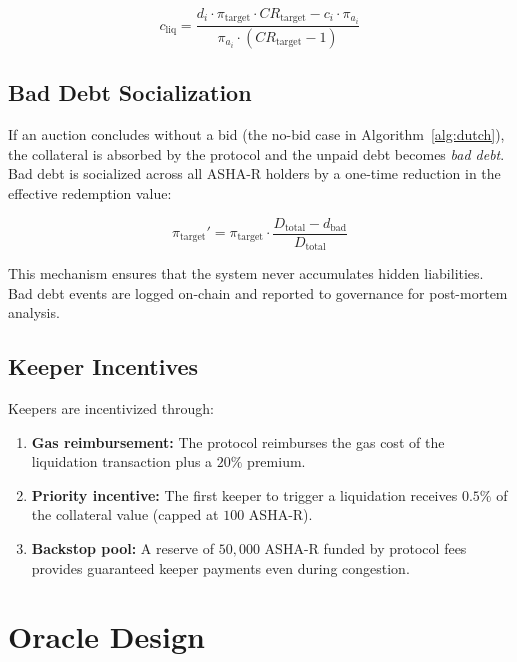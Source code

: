 \documentclass[11pt,a4paper]{article}
\newcommand{\ashares}{\textsc{ASHA-R}\xspace}
\newcommand{\CR}{\mathit{CR}}
\begin{document}
\begin{equation}
  c_{\text{liq}} = \frac{d_i \cdot \pi_{\text{target}} \cdot \CR_{\text{target}} - c_i \cdot \pi_{a_i}}{\pi_{a_i} \cdot (\CR_{\text{target}} - 1)}
\end{equation}

\subsection{Bad Debt Socialization}

If an auction concludes without a bid (the no-bid case in Algorithm~\ref{alg:dutch}), the collateral is absorbed by the protocol and the unpaid debt becomes \emph{bad debt}.
Bad debt is socialized across all \ashares holders by a one-time reduction in the effective redemption value:

\begin{equation}
  \pi_{\text{target}}' = \pi_{\text{target}} \cdot \frac{D_{\text{total}} - d_{\text{bad}}}{D_{\text{total}}}
\end{equation}

This mechanism ensures that the system never accumulates hidden liabilities.
Bad debt events are logged on-chain and reported to governance for post-mortem analysis.

\subsection{Keeper Incentives}

Keepers are incentivized through:
\begin{enumerate}
  \item \textbf{Gas reimbursement:} The protocol reimburses the gas cost of the liquidation transaction plus a $20\%$ premium.
  \item \textbf{Priority incentive:} The first keeper to trigger a liquidation receives $0.5\%$ of the collateral value (capped at $100$ \ashares).
  \item \textbf{Backstop pool:} A reserve of $50{,}000$ \ashares funded by protocol fees provides guaranteed keeper payments even during congestion.
\end{enumerate}

\section{Oracle Design}
\label{sec:oracles}
\end{document}
